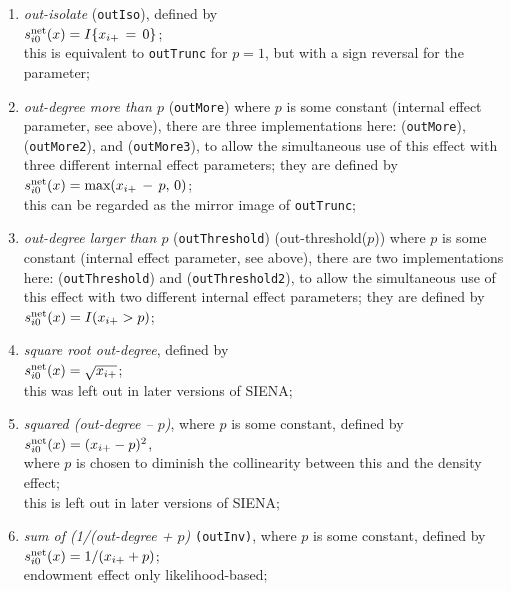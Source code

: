 \documentclass[a4paper,fleqn,11pt]{article}
\newcommand{\+}{\, + \,}
\newcommand{\si}{{\sf SIENA}}
\newcommand{\vit}{\theenumi}
\begin{document}
\begin{enumerate}
 \item {\em out-isolate} (\texttt{outIso}), defined by \\
 $s^{\rm net}_{i\vit}(x) = I\{x_{i+} \,=\,  0\}$;\\
 this is equivalent to \texttt{outTrunc} for $p=1$,
 but with a sign reversal for the parameter;


 \item {\em out-degree more than $p$} (\texttt{outMore}) where $p$ is some constant
 (internal effect parameter, see above),
  there are three implementations here:
 (\texttt{outMore}), (\texttt{outMore2}), and (\texttt{outMore3}),
 to allow the simultaneous use of this
 effect with three different internal effect parameters;
 they are defined by \\
 $s^{\rm net}_{i\vit}(x) = \text{max}(x_{i+}\,-\, p, \, 0)$;\\
 this can be regarded as the mirror image of \texttt{outTrunc};

 \item {\em out-degree larger than $p$} (\texttt{outThreshold})
 (out-threshold($p$)) where $p$ is some constant
 (internal effect parameter, see above),
  there are two implementations here:
(\texttt{outThreshold}) and (\texttt{outThreshold2}),
 to allow the simultaneous use of this
 effect with two different internal effect parameters;
 they are defined by \\
 $s^{\rm net}_{i\vit}(x) = I(x_{i+} > p)$;\\

 \item {\em square root out-degree}, defined by  \\
 $s^{\rm net}_{i\vit}(x) = \sqrt{x_{i+}}$;\\
 this was left out in later versions of \si;

 \item {\em squared (out-degree -- $p$)}, where $p$ is some constant,
 defined by  \\
 $s^{\rm net}_{i\vit}(x) = (x_{i+} - p)^2$,\\
 where $p$ is chosen to diminish the collinearity between this
 and the density effect;\\
 this is left out in later versions of \si;

 \item {\em sum of (1/(out-degree + $p$)} \texttt{(outInv)},
 where $p$ is some constant,  defined by  \\
 $s^{\rm net}_{i\vit}(x) = 1/(x_{i+} + p)$;\\
 endowment effect only likelihood-based;


\end{enumerate}
\end{document}
